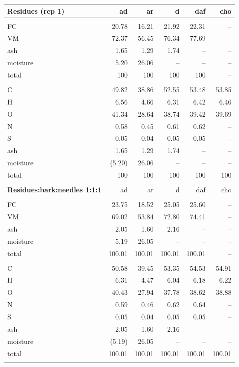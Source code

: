 \documentclass[12pt,titlepage]{article}
\begin{document}
\begin{longtable}{lrrrrr}
    \textbf{Residues (rep 1)} & ad & ar & d & daf & cho \\
    \hline \\
    FC       & 20.78  & 16.21  & 21.92  & 22.31  & -- \\
    VM       & 72.37  & 56.45  & 76.34  & 77.69  & -- \\
    ash      & 1.65   & 1.29   & 1.74   & --     & -- \\
    moisture & 5.20   & 26.06  & --     & --     & -- \\
    total    & 100    & 100    & 100    & 100    & -- \\
    \\
    C        & 49.82  & 38.86  & 52.55  & 53.48  & 53.85 \\
    H        & 6.56   & 4.66   & 6.31   & 6.42   & 6.46 \\
    O        & 41.34  & 28.64  & 38.74  & 39.42  & 39.69 \\
    N        & 0.58   & 0.45   & 0.61   & 0.62   & -- \\
    S        & 0.05   & 0.04   & 0.05   & 0.05   & -- \\
    ash      & 1.65   & 1.29   & 1.74   & --     & -- \\
    moisture & (5.20) & 26.06  & --     & --     & -- \\
    total    & 100    & 100    & 100    & 100    & 100 \\
    \\

    \textbf{Residues:bark:needles 1:1:1} & ad & ar & d & daf & cho \\
    \hline \\
    FC       & 23.75  & 18.52  & 25.05  & 25.60  & -- \\
    VM       & 69.02  & 53.84  & 72.80  & 74.41  & -- \\
    ash      & 2.05   & 1.60   & 2.16   & --     & -- \\
    moisture & 5.19   & 26.05  & --     & --     & -- \\
    total    & 100.01 & 100.01 & 100.01 & 100.01 & -- \\
    \\
    C        & 50.58  & 39.45  & 53.35  & 54.53  & 54.91 \\
    H        & 6.31   & 4.47   & 6.04   & 6.18   & 6.22 \\
    O        & 40.43  & 27.94  & 37.78  & 38.62  & 38.88 \\
    N        & 0.59   & 0.46   & 0.62   & 0.64   & -- \\
    S        & 0.05   & 0.04   & 0.05   & 0.05   & -- \\
    ash      & 2.05   & 1.60   & 2.16   & --     & -- \\
    moisture & (5.19) & 26.05  & --     & --     & -- \\
    total    & 100.01 & 100.01 & 100.01 & 100.01 & 100.01 \\
    \\


\end{longtable}
\end{document}
